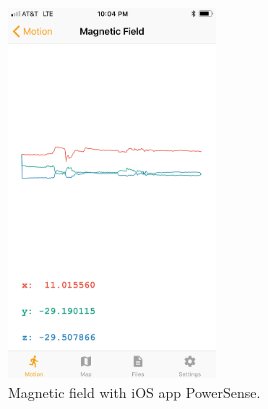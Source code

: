 \documentclass[journal]{IEEEtranTIE}
\begin{document}
\begin{figure}[!t]\centering
	\includegraphics[width=5.5cm]{magnetic_field}
	\caption{Magnetic field with iOS app PowerSense.}\label{fig:fig3}
\end{figure}



\ %
\end{document}
